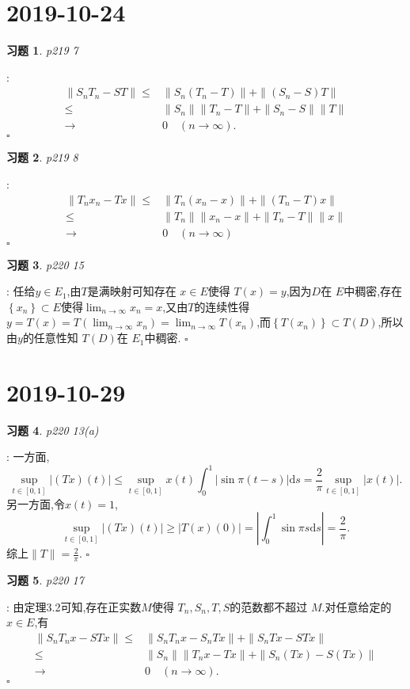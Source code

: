\documentclass[a4paper]{article}
\newtheorem*{exe}{习题}
\newenvironment{sol}{{\noindent\bfseries 解}:}{\hfill $\square$\par}
\begin{document}
\section{2019-10-24}
\begin{exe}
  p219 7
\end{exe}
\begin{sol}
  \begin{align*}
    \|S_nT_n-ST\|\le & \|S_n(T_n-T)\|+\|(S_n-S)T\|\\
    \le & \|S_n\| \|T_n-T\|+\|S_n-S\| \|T\|\\
    \to & 0 \quad \left( n\to\infty \right) 
  .\end{align*}
\end{sol}
\begin{exe}
  p219 8	
\end{exe}
\begin{sol}
  \begin{align*}
    \|T_nx_n-Tx\|\le & \|T_n(x_n-x)\|+\|(T_n-T)x\|\\
    \le & \|T_n\|\|x_n-x\|+\|T_n-T\|\|x\|\\
    \to & 0\quad \left( n\to \infty \right) 
  \end{align*}
\end{sol}
\begin{exe}
  p220 15
\end{exe}
\begin{sol}
  任给$y\in E_1$,由$T$是满映射可知存在 $x\in E$使得 $T(x)=y$,因为$D$在 $E$中稠密,存在 $\left\{ x_n \right\} \subset E$使得$\lim_{n \to \infty}x_n=x $,又由$T$的连续性得 $ y=T(x)=T\left( \lim_{n \to \infty} x_n \right)=\lim_{n\to \infty}T(x_n) $,而$\left\{ T(x_n) \right\}\subset T(D) $,所以由$y$的任意性知 $T(D)$在 $E_1$中稠密.
\end{sol}
\section{2019-10-29}
\begin{exe}
  p220 13(a)
\end{exe}
\begin{sol}
  一方面,
  \[
    \sup_{t\in [0,1]}\left| (Tx)(t) \right|\le \sup_{t\in [0,1]}x(t)\int_0^1\left| \sin\pi(t-s) \right|\mathrm{d}s=\frac{2}{\pi}\sup_{t\in [0,1]}\left| x(t) \right|   
  .\]
  另一方面,令$x(t)=1$,
   \[
     \sup_{t\in [0,1]}\left| (Tx)(t) \right| \ge \left| T(x)(0) \right| =\left| \int_0^1\sin\pi s \mathrm{d}s \right|=\frac{2}{\pi} 
  .\] 
  综上$\|T\|=\frac{2}{\pi}$.
\end{sol}
\begin{exe}
  p220 17
\end{exe}
\begin{sol}
  由定理3.2可知,存在正实数$M$使得 $T_n,S_n,T,S$的范数都不超过 $M$.对任意给定的 $x\in E$,有
  \begin{align*}
    \|S_nT_nx-STx\|\le &\|S_nT_nx-S_nTx\|+\|S_nTx-STx\|\\
    \le &\|S_n\|\|T_nx-Tx\|+\|S_n(Tx)-S(Tx)\|\\
    \to & 0 \quad \left( n\to \infty \right)  
  .\end{align*}
\end{sol}
\end{document}
